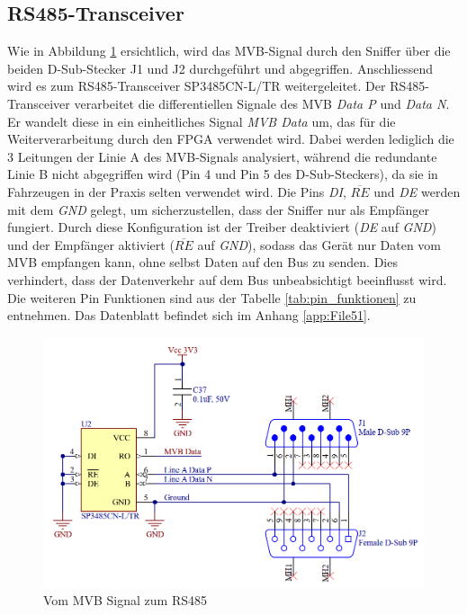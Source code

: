 \subsection{RS485-Transceiver}

Wie in Abbildung \ref{fig:MVB to RS485} ersichtlich, wird das MVB-Signal durch den Sniffer über die beiden D-Sub-Stecker J1 und J2 durchgeführt und abgegriffen. Anschliessend wird es zum RS485-Transceiver SP3485CN-L/TR weitergeleitet. Der RS485-Transceiver verarbeitet die differentiellen Signale des MVB \textit{Data P} und \textit{Data N}. Er wandelt diese in ein einheitliches Signal \textit{MVB Data} um, das für die Weiterverarbeitung durch den FPGA verwendet wird. Dabei werden lediglich die 3 Leitungen der Linie A des MVB-Signals analysiert, während die redundante Linie B nicht abgegriffen wird (Pin 4 und Pin 5 des D-Sub-Steckers), da sie in Fahrzeugen in der Praxis selten verwendet wird. Die Pins \textit{DI}, $\overline{RE}$ und \textit{DE} werden mit dem \textit{GND} gelegt, um sicherzustellen, dass der Sniffer nur als Empfänger fungiert. Durch diese Konfiguration ist der Treiber deaktiviert (\textit{DE} auf \textit{GND}) und der Empfänger aktiviert ($\overline{RE}$ auf \textit{GND}), sodass das Gerät nur Daten vom MVB empfangen kann, ohne selbst Daten auf den Bus zu senden. Dies verhindert, dass der Datenverkehr auf dem Bus unbeabsichtigt beeinflusst wird. Die weiteren Pin Funktionen sind aus der Tabelle \ref{tab:pin_funktionen} zu entnehmen. Das Datenblatt befindet sich im Anhang \ref{app:File51}.

\begin{figure}[H]
    \centering
    \includegraphics[width=0.8\linewidth]{Figures/Chap3/Schematics/MVB to RS485.png}
    \caption{Vom MVB Signal zum RS485}
    \label{fig:MVB to RS485}
\end{figure}

